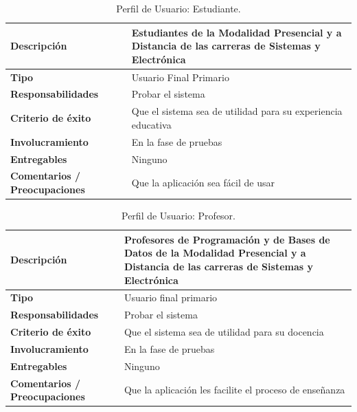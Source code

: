 \begin{table}[h!]
  \begin{tabular}{|p{}|p{}|}
    \hline
    \textbf{Descripción} & Estudiantes de la Modalidad Presencial y a Distancia de las carreras de Sistemas y Electrónica \\
    \hline
    \textbf{Tipo} & Usuario Final Primario \\
    \hline
    \textbf{Responsabilidades} & Probar el sistema \\
    \hline
    \textbf{Criterio de éxito} & Que el sistema sea de utilidad para su experiencia educativa \\
    \hline
    \textbf{Involucramiento} & En la fase de pruebas \\
    \hline
    \textbf{Entregables} & Ninguno \\
    \hline
    \textbf{Comentarios / Preocupaciones} & Que la aplicación sea fácil de usar \\
    \hline
  \end{tabular}
  \caption{Perfil de Usuario: Estudiante.}
  \label{per-user-estu}
\end{table}

\begin{table}[h!]
  \begin{tabular}{|p{}|p{}|}
    \hline
    \textbf{Descripción} & Profesores de Programación y de Bases de Datos de la Modalidad Presencial y a Distancia de las carreras de Sistemas y Electrónica \\
    \hline
    \textbf{Tipo} & Usuario final primario \\
    \hline
    \textbf{Responsabilidades} & Probar el sistema \\
    \hline
    \textbf{Criterio de éxito} & Que el sistema sea de utilidad para su docencia \\
    \hline
    \textbf{Involucramiento} & En la fase de pruebas \\
    \hline
    \textbf{Entregables} & Ninguno \\
    \hline
    \textbf{Comentarios / Preocupaciones} & Que la aplicación les facilite el proceso de enseñanza \\
    \hline
  \end{tabular}
  \caption{Perfil de Usuario: Profesor.}
  \label{per-user-prof}
\end{table}

\pagebreak

